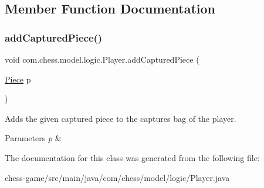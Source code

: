 \subsection{Member Function Documentation}
\mbox{\label{classcom_1_1chess_1_1model_1_1logic_1_1_player_a4a1d2d63ea4d89170ce7174acf8a9d26}} 
\subsubsection{\texorpdfstring{addCapturedPiece()}{addCapturedPiece()}}
{\footnotesize\ttfamily void com.\+chess.\+model.\+logic.\+Player.\+add\+Captured\+Piece (\begin{DoxyParamCaption}\item[{\mbox{\hyperlink{classcom_1_1chess_1_1model_1_1pieces_1_1_piece}{Piece}}}]{p }\end{DoxyParamCaption})\hspace{0.3cm}{\ttfamily [inline]}}

Adds the given captured piece to the captures bag of the player. 
\begin{DoxyParams}{Parameters}
{\em p} & \\
\hline
\end{DoxyParams}


The documentation for this class was generated from the following file\+:\begin{DoxyCompactItemize}
\item 
chess-\/game/src/main/java/com/chess/model/logic/Player.\+java\end{DoxyCompactItemize}
